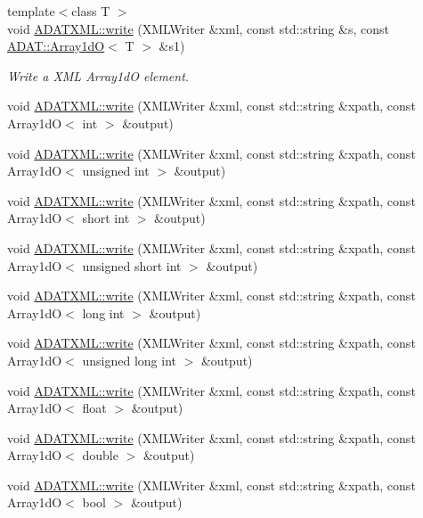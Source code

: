 \begin{DoxyCompactItemize}
\item 
{\footnotesize template$<$class T $>$ }\\void \mbox{\hyperlink{group__io_ga4aca42ea47cabf4b5644cf09729343ce}{A\+D\+A\+T\+X\+M\+L\+::write}} (X\+M\+L\+Writer \&xml, const std\+::string \&s, const \mbox{\hyperlink{classADAT_1_1Array1dO}{A\+D\+A\+T\+::\+Array1dO}}$<$ T $>$ \&s1)
\begin{DoxyCompactList}\small\item\em Write a X\+ML Array1dO element. \end{DoxyCompactList}\item 
void \mbox{\hyperlink{group__io_gaa6e09c5b36ae52183896f9566e971ca5}{A\+D\+A\+T\+X\+M\+L\+::write}} (X\+M\+L\+Writer \&xml, const std\+::string \&xpath, const Array1dO$<$ int $>$ \&output)
\item 
void \mbox{\hyperlink{group__io_ga32f158a165ed5de5be9e8391eb747012}{A\+D\+A\+T\+X\+M\+L\+::write}} (X\+M\+L\+Writer \&xml, const std\+::string \&xpath, const Array1dO$<$ unsigned int $>$ \&output)
\item 
void \mbox{\hyperlink{group__io_ga0490b2b22643afb2ca599baccded2556}{A\+D\+A\+T\+X\+M\+L\+::write}} (X\+M\+L\+Writer \&xml, const std\+::string \&xpath, const Array1dO$<$ short int $>$ \&output)
\item 
void \mbox{\hyperlink{group__io_gada32aa6101427e2983e6507da6d49ff2}{A\+D\+A\+T\+X\+M\+L\+::write}} (X\+M\+L\+Writer \&xml, const std\+::string \&xpath, const Array1dO$<$ unsigned short int $>$ \&output)
\item 
void \mbox{\hyperlink{group__io_ga22d9e5badf27f6d860eeba79ca71243f}{A\+D\+A\+T\+X\+M\+L\+::write}} (X\+M\+L\+Writer \&xml, const std\+::string \&xpath, const Array1dO$<$ long int $>$ \&output)
\item 
void \mbox{\hyperlink{group__io_ga930bf7dd8f7a313ec5f29eacc08d06ba}{A\+D\+A\+T\+X\+M\+L\+::write}} (X\+M\+L\+Writer \&xml, const std\+::string \&xpath, const Array1dO$<$ unsigned long int $>$ \&output)
\item 
void \mbox{\hyperlink{group__io_ga83e5a11ea845805029325ff1c7946f36}{A\+D\+A\+T\+X\+M\+L\+::write}} (X\+M\+L\+Writer \&xml, const std\+::string \&xpath, const Array1dO$<$ float $>$ \&output)
\item 
void \mbox{\hyperlink{group__io_ga60a959cadded600c1c4768075005f76e}{A\+D\+A\+T\+X\+M\+L\+::write}} (X\+M\+L\+Writer \&xml, const std\+::string \&xpath, const Array1dO$<$ double $>$ \&output)
\item 
void \mbox{\hyperlink{group__io_ga17afd14eb981c71780dc1b0074758afc}{A\+D\+A\+T\+X\+M\+L\+::write}} (X\+M\+L\+Writer \&xml, const std\+::string \&xpath, const Array1dO$<$ bool $>$ \&output)

\end{DoxyCompactItemize}
